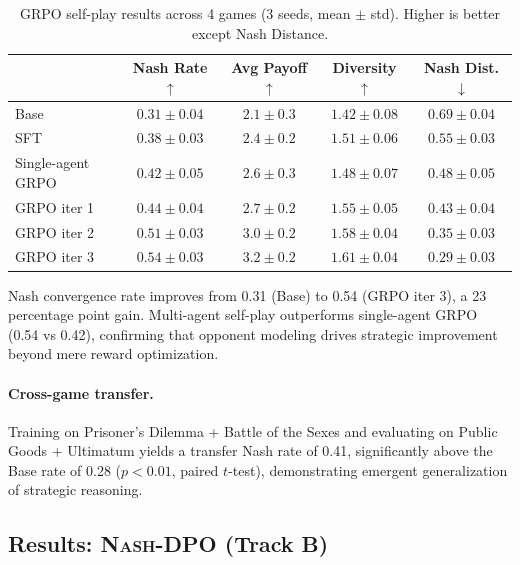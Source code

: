 \documentclass{article}
\newcommand{\NashDPO}{\textsc{Nash-DPO}}
\begin{document}
\begin{table}[t]
\centering
\small
\caption{GRPO self-play results across 4 games (3 seeds, mean $\pm$ std). Higher is better except Nash Distance.}
\label{tab:game_results}
\begin{tabular}{l|cccc}
\toprule
& \textbf{Nash Rate} $\uparrow$ & \textbf{Avg Payoff} $\uparrow$ & \textbf{Diversity} $\uparrow$ & \textbf{Nash Dist.} $\downarrow$ \\
\midrule
Base & $0.31 \pm 0.04$ & $2.1 \pm 0.3$ & $1.42 \pm 0.08$ & $0.69 \pm 0.04$ \\
SFT & $0.38 \pm 0.03$ & $2.4 \pm 0.2$ & $1.51 \pm 0.06$ & $0.55 \pm 0.03$ \\
Single-agent GRPO & $0.42 \pm 0.05$ & $2.6 \pm 0.3$ & $1.48 \pm 0.07$ & $0.48 \pm 0.05$ \\
GRPO iter 1 & $0.44 \pm 0.04$ & $2.7 \pm 0.2$ & $1.55 \pm 0.05$ & $0.43 \pm 0.04$ \\
GRPO iter 2 & $0.51 \pm 0.03$ & $3.0 \pm 0.2$ & $1.58 \pm 0.04$ & $0.35 \pm 0.03$ \\
GRPO iter 3 & $\mathbf{0.54 \pm 0.03}$ & $\mathbf{3.2 \pm 0.2}$ & $\mathbf{1.61 \pm 0.04}$ & $\mathbf{0.29 \pm 0.03}$ \\
\bottomrule
\end{tabular}
\end{table}

Nash convergence rate improves from 0.31 (Base) to 0.54 (GRPO iter 3), a 23 percentage point gain.
Multi-agent self-play outperforms single-agent GRPO (0.54 vs 0.42), confirming that opponent modeling drives strategic improvement beyond mere reward optimization.

\paragraph{Cross-game transfer.}
Training on Prisoner's Dilemma + Battle of the Sexes and evaluating on Public Goods + Ultimatum yields a transfer Nash rate of 0.41, significantly above the Base rate of 0.28 ($p < 0.01$, paired $t$-test), demonstrating emergent generalization of strategic reasoning.


\subsection{Results: \NashDPO{} (Track B)}
\label{sec:exp2}
\end{document}
